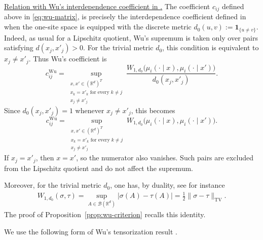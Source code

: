 \documentclass[12pt,reqno,letterpaper]{amsart}
\theoremstyle{definition}
\theoremstyle{remark}
\numberwithin{equation}{section}
\newcommand{\R}{\mathbb R}
\newcommand{\TV}{\mathrm{TV}}
\begin{document}
\underline{Relation with Wu’s interdependence coefficient in \cite{Wu}.} 
The coefficient $c_{ij}$ defined above in \eqref{eq:wu-matrix}, is precisely the interdependence coefficient defined in \cite[(2.3)]{Wu}  when the one-site space is equipped with the discrete metric $d_0(u,v):=\mathbf1_{\{u\ne v\}}.$ 
 Indeed, as usual for a Lipschitz quotient, Wu's supremum is taken
only over pairs
satisfying
\(
 d(x_j,x'_j)>0.\)
For the trivial metric \(d_0\), this condition is equivalent to
\(x_j\ne x'_j\).  Thus Wu's coefficient is
\[
 c_{ij}^{\mathrm{Wu}}
=\sup_{\substack{x,x'\in(\R^d)^T\\
 x_k=x'_k\text{ for every }k\ne j\\
 x_j\ne x'_j}}
 \frac{
 W_{1,d_0}\bigl(\mu_i(\cdot\mid x),
                 \mu_i(\cdot\mid x')\bigr)
 }{
 d_0(x_j,x'_j)
 }.
\]
Since \(d_0(x_j,x'_j)=1\) whenever \(x_j\ne x'_j\), this becomes
\[
 c_{ij}^{\mathrm{Wu}}
 =
 \sup_{\substack{x,x'\in(\R^d)^T\\
 x_k=x'_k\text{ for every }k\ne j\\
 x_j\ne x'_j}}
 W_{1,d_0}\bigl(\mu_i(\cdot\mid x),
                 \mu_i(\cdot\mid x')\bigr).
\]
If \(x_j=x'_j\), then \(x=x'\), so the numerator also vanishes.  Such
pairs are excluded from the Lipschitz quotient and do not affect the
supremum.

Moreover, for the trivial metric $d_0$, one has, by duality, see for instance \cite[below (2.1)]{Wu}
\begin{align} \label{eq: Wasserstein_TV}
 W_{1,d_0}(\sigma,\tau)
 =
 \sup_{A\in\mathcal B(\R^d)}|\sigma(A)-\tau(A)|
 =
 \frac12\|\sigma-\tau\|_{\TV}.
\end{align}
The proof of Proposition~\ref{prop:wu-criterion} recalls this identity.

We use the following form of Wu's tensorization result
\cite[Theorem 2.1]{Wu}.
\end{document}
